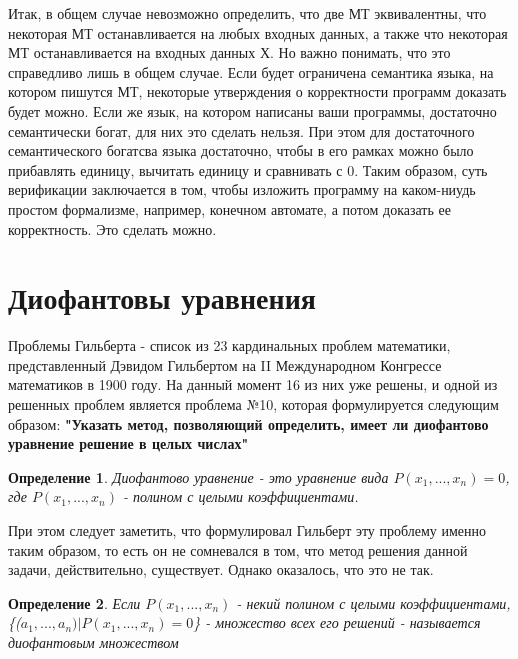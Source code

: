 \documentclass[a4paper]{article}
\newtheorem{definition}{Определение}
\begin{document}
{Итак, в общем случае невозможно определить, что две МТ эквивалентны, что некоторая МТ останавливается на любых входных данных, а также что некоторая МТ останавливается на входных данных Х. Но важно понимать, что это справедливо лишь в общем случае. Если будет ограничена семантика языка, на котором пишутся МТ, некоторые утверждения о корректности программ доказать будет можно. Если же язык, на котором написаны ваши программы, достаточно семантически богат, для них это сделать нельзя. При этом для достаточного семантического богатсва языка достаточно, чтобы в его рамках можно было прибавлять единицу, вычитать единицу и сравнивать с 0. 
\newline Таким образом, суть верификации заключается в том, чтобы изложить программу на каком-ниудь простом формализме, например, конечном автомате, а потом доказать ее корректность. Это сделать можно. 

\section{Диофантовы уравнения}
\large{
Проблемы Гильберта - список из 23 кардинальных проблем математики, представленный Дэвидом Гильбертом на II Международном Конгрессе математиков в 1900 году. На данный момент 16 из них уже решены, и одной из решенных проблем является проблема №10, которая формулируется следующим образом: 
}
\newline
\textbf{
"Указать метод, позволяющий определить, имеет ли диофантово уравнение решение в целых числах"
}

\begin{definition}
Диофантово уравнение - это уравнение вида $P(x_1,...,x_n) = 0$, где $P(x_1,...,x_n)$ - полином с целыми коэффициентами.
\end{definition}

При этом следует заметить, что формулировал Гильберт эту проблему именно таким образом, то есть он не сомневался в том, что метод решения данной задачи, действительно, существует. Однако оказалось, что это не так.

\begin{definition}
Если $P(x_1,...,x_n)$ - некий полином с целыми коэффициентами, \{($a_1,...,a_n) | P(x_1,...,x_n) = 0$\} - множество всех его решений - называется диофантовым множеством
\end{definition}

}
\end{document}
